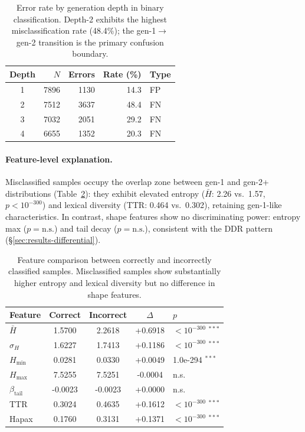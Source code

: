 \begin{table}[ht]
\centering
\small
\caption{Error rate by generation depth in binary classification. Depth-2 exhibits the highest misclassification rate (48.4\%); the gen-1$\to$gen-2 transition is the primary confusion boundary.}
\label{tab:error-depth}
\begin{tabular}{crrrl}
\toprule
\textbf{Depth} & $N$ & \textbf{Errors} & \textbf{Rate (\%)} & \textbf{Type} \\
\midrule
1 & 7896 & 1130 & 14.3 & FP \\
2 & 7512 & 3637 & 48.4 & FN \\
3 & 7032 & 2051 & 29.2 & FN \\
4 & 6655 & 1352 & 20.3 & FN \\
\bottomrule
\end{tabular}
\end{table}

\paragraph{Feature-level explanation.}
Misclassified samples occupy the overlap zone between gen-1 and gen-2+ distributions (Table~\ref{tab:error-features}): they exhibit elevated entropy ($\bar{H}$: 2.26 vs.\ 1.57, $p<10^{-300}$) and lexical diversity (TTR: 0.464 vs.\ 0.302), retaining gen-1-like characteristics.
In contrast, shape features show no discriminating power: entropy max ($p = \text{n.s.}$) and tail decay ($p = \text{n.s.}$), consistent with the DDR pattern (\S\ref{sec:results-differential}).

\begin{table}[ht]
\centering
\small
\caption{Feature comparison between correctly and incorrectly classified samples. Misclassified samples show substantially higher entropy and lexical diversity but no difference in shape features.}
\label{tab:error-features}
\begin{tabular}{lcccl}
\toprule
\textbf{Feature} & \textbf{Correct} & \textbf{Incorrect} & $\Delta$ & $p$ \\
\midrule
$\bar{H}$ & 1.5700 & 2.2618 & +0.6918 & $<10^{-300}$ $^{***}$ \\
$\sigma_H$ & 1.6227 & 1.7413 & +0.1186 & $<10^{-300}$ $^{***}$ \\
$H_{\min}$ & 0.0281 & 0.0330 & +0.0049 & 1.0e-294 $^{***}$ \\
$H_{\max}$ & 7.5255 & 7.5251 & -0.0004 & n.s. \\
$\beta_{\mathrm{tail}}$ & -0.0023 & -0.0023 & +0.0000 & n.s. \\
TTR & 0.3024 & 0.4635 & +0.1612 & $<10^{-300}$ $^{***}$ \\
Hapax & 0.1760 & 0.3131 & +0.1371 & $<10^{-300}$ $^{***}$ \\
\bottomrule
\end{tabular}
\end{table}

